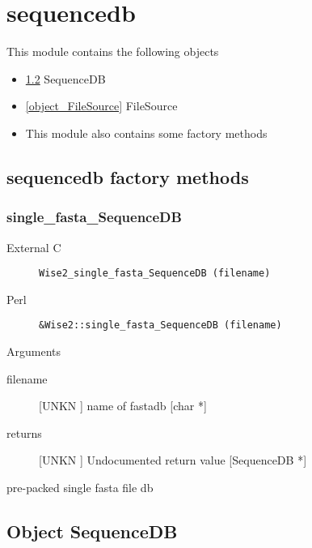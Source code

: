 \section{sequencedb}
\label{module_sequencedb}
This module contains the following objects

\begin{itemize}
\item \ref{object_SequenceDB} SequenceDB

\item \ref{object_FileSource} FileSource

\item This module also contains some factory methods
\end{itemize}
\subsection{sequencedb factory methods}
\subsubsection{single_fasta_SequenceDB}
\begin{description}
\item[External C] {\tt Wise2_single_fasta_SequenceDB (filename)}
\item[Perl] {\tt &Wise2::single_fasta_SequenceDB (filename)}

\end{description}
Arguments
\begin{description}
\item[filename] [UNKN ] name of fastadb [char *]
\item[returns] [UNKN ] Undocumented return value [SequenceDB *]
\end{description}
pre-packed single fasta file db






\subsection{Object SequenceDB}

\label{object_SequenceDB}

